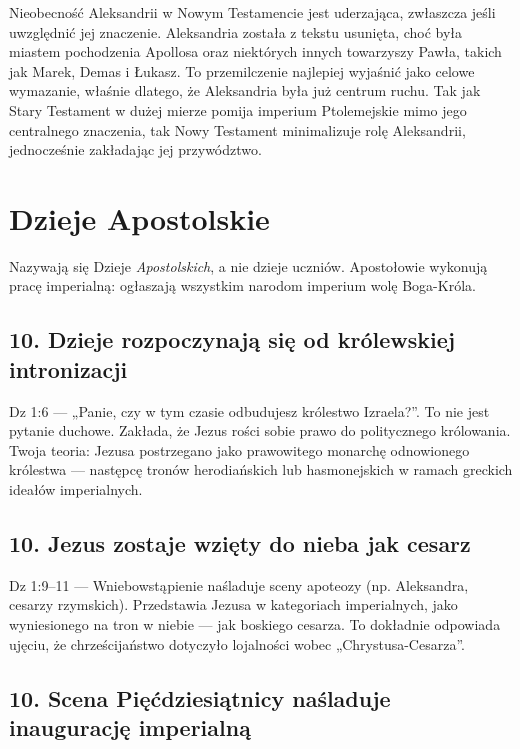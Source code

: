 Nieobecność Aleksandrii w Nowym Testamencie jest uderzająca, zwłaszcza jeśli uwzględnić jej znaczenie.
Aleksandria została z tekstu usunięta, choć była miastem pochodzenia Apollosa oraz niektórych innych towarzyszy Pawła, takich jak Marek, Demas i Łukasz.
To przemilczenie najlepiej wyjaśnić jako celowe wymazanie, właśnie dlatego, że Aleksandria była już centrum ruchu.
Tak jak Stary Testament w dużej mierze pomija imperium Ptolemejskie mimo jego centralnego znaczenia, tak Nowy Testament minimalizuje rolę Aleksandrii, jednocześnie zakładając jej przywództwo.

\section{Dzieje Apostolskie}\label{subsec:acts-of-the-apostles}

Nazywają się Dzieje \emph{Apostolskich}, a nie dzieje uczniów.
Apostołowie wykonują pracę imperialną: ogłaszają wszystkim narodom imperium wolę Boga-Króla.

\subsection{10.
Dzieje rozpoczynają się od królewskiej intronizacji}\label{subsec:acts-opens-with-a-royal-enthronement}

Dz 1:6 --- „Panie, czy w tym czasie odbudujesz królestwo Izraela?”.
To nie jest pytanie duchowe.
Zakłada, że Jezus rości sobie prawo do politycznego królowania.
Twoja teoria: Jezusa postrzegano jako prawowitego monarchę odnowionego królestwa — następcę tronów herodiańskich lub hasmonejskich w ramach greckich ideałów imperialnych.

\subsection{10.
Jezus zostaje wzięty do nieba jak cesarz}\label{subsec:jesus-is-taken-up-like-an-emperor}

Dz 1:9–11 --- Wniebowstąpienie naśladuje sceny apoteozy (np. Aleksandra, cesarzy rzymskich).
Przedstawia Jezusa w kategoriach imperialnych, jako wyniesionego na tron w niebie — jak boskiego cesarza.
To dokładnie odpowiada ujęciu, że chrześcijaństwo dotyczyło lojalności wobec „Chrystusa-Cesarza”.

\subsection{10.
Scena Pięćdziesiątnicy naśladuje inaugurację imperialną}\label{subsec:the-pentecost-scene-mimics-an-imperial-inauguration}

